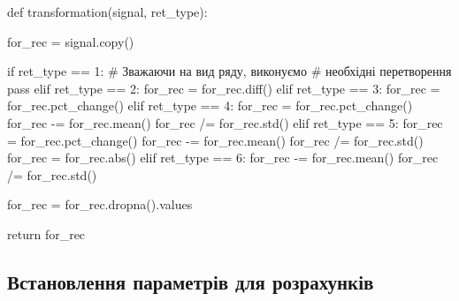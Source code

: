 \documentclass[
  letterpaper,
]{report}
\newenvironment{Shaded}{\begin{snugshade}}{\end{snugshade}}
\newcommand{\BuiltInTok}[1]{\textcolor[rgb]{0.00,0.23,0.31}{#1}}
\newcommand{\CommentTok}[1]{\textcolor[rgb]{0.37,0.37,0.37}{#1}}
\newcommand{\ControlFlowTok}[1]{\textcolor[rgb]{0.00,0.23,0.31}{#1}}
\newcommand{\DecValTok}[1]{\textcolor[rgb]{0.68,0.00,0.00}{#1}}
\newcommand{\KeywordTok}[1]{\textcolor[rgb]{0.00,0.23,0.31}{#1}}
\newcommand{\NormalTok}[1]{\textcolor[rgb]{0.00,0.23,0.31}{#1}}
\newcommand{\OperatorTok}[1]{\textcolor[rgb]{0.37,0.37,0.37}{#1}}
\begin{document}
\begin{Shaded}
\begin{Highlighting}[]
\KeywordTok{def}\NormalTok{ transformation(signal, ret\_type):}

\NormalTok{    for\_rec }\OperatorTok{=}\NormalTok{ signal.copy()}

    \ControlFlowTok{if}\NormalTok{ ret\_type }\OperatorTok{==} \DecValTok{1}\NormalTok{:       }\CommentTok{\# Зважаючи на вид ряду, виконуємо}
                            \CommentTok{\# необхідні перетворення}
        \ControlFlowTok{pass}
    \ControlFlowTok{elif}\NormalTok{ ret\_type }\OperatorTok{==} \DecValTok{2}\NormalTok{:}
\NormalTok{        for\_rec }\OperatorTok{=}\NormalTok{ for\_rec.diff()}
    \ControlFlowTok{elif}\NormalTok{ ret\_type }\OperatorTok{==} \DecValTok{3}\NormalTok{:}
\NormalTok{        for\_rec }\OperatorTok{=}\NormalTok{ for\_rec.pct\_change()}
    \ControlFlowTok{elif}\NormalTok{ ret\_type }\OperatorTok{==} \DecValTok{4}\NormalTok{:}
\NormalTok{        for\_rec }\OperatorTok{=}\NormalTok{ for\_rec.pct\_change()}
\NormalTok{        for\_rec }\OperatorTok{{-}=}\NormalTok{ for\_rec.mean()}
\NormalTok{        for\_rec }\OperatorTok{/=}\NormalTok{ for\_rec.std()}
    \ControlFlowTok{elif}\NormalTok{ ret\_type }\OperatorTok{==} \DecValTok{5}\NormalTok{: }
\NormalTok{        for\_rec }\OperatorTok{=}\NormalTok{ for\_rec.pct\_change()}
\NormalTok{        for\_rec }\OperatorTok{{-}=}\NormalTok{ for\_rec.mean()}
\NormalTok{        for\_rec }\OperatorTok{/=}\NormalTok{ for\_rec.std()}
\NormalTok{        for\_rec }\OperatorTok{=}\NormalTok{ for\_rec.}\BuiltInTok{abs}\NormalTok{()}
    \ControlFlowTok{elif}\NormalTok{ ret\_type }\OperatorTok{==} \DecValTok{6}\NormalTok{:}
\NormalTok{        for\_rec }\OperatorTok{{-}=}\NormalTok{ for\_rec.mean()}
\NormalTok{        for\_rec }\OperatorTok{/=}\NormalTok{ for\_rec.std()}

\NormalTok{    for\_rec }\OperatorTok{=}\NormalTok{ for\_rec.dropna().values}

    \ControlFlowTok{return}\NormalTok{ for\_rec}
\end{Highlighting}
\end{Shaded}

\hypertarget{ux432ux441ux442ux430ux43dux43eux432ux43bux435ux43dux43dux44f-ux43fux430ux440ux430ux43cux435ux442ux440ux456ux432-ux434ux43bux44f-ux440ux43eux437ux440ux430ux445ux443ux43dux43aux456ux432}{%
\subsection{Встановлення параметрів для
розрахунків}\label{ux432ux441ux442ux430ux43dux43eux432ux43bux435ux43dux43dux44f-ux43fux430ux440ux430ux43cux435ux442ux440ux456ux432-ux434ux43bux44f-ux440ux43eux437ux440ux430ux445ux443ux43dux43aux456ux432}}
\end{document}
